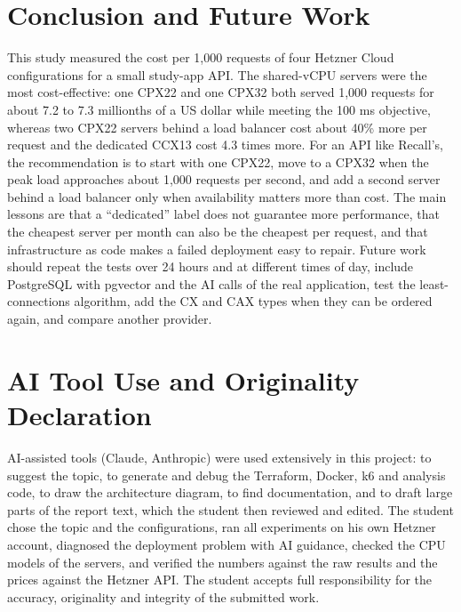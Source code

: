 \documentclass[conference,a4paper]{IEEEtran}
\begin{document}
\section{Conclusion and Future Work}
\label{sec:conclusion}

This study measured the cost per 1,000 requests of four Hetzner Cloud configurations for a small study-app API. The shared-vCPU servers were the most cost-effective: one CPX22 and one CPX32 both served 1,000 requests for about 7.2 to 7.3 millionths of a US dollar while meeting the 100 ms objective, whereas two CPX22 servers behind a load balancer cost about 40\% more per request and the dedicated CCX13 cost 4.3 times more. For an API like Recall's, the recommendation is to start with one CPX22, move to a CPX32 when the peak load approaches about 1,000 requests per second, and add a second server behind a load balancer only when availability matters more than cost. The main lessons are that a ``dedicated'' label does not guarantee more performance, that the cheapest server per month can also be the cheapest per request, and that infrastructure as code makes a failed deployment easy to repair. Future work should repeat the tests over 24 hours and at different times of day, include PostgreSQL with pgvector and the AI calls of the real application, test the least-connections algorithm, add the CX and CAX types when they can be ordered again, and compare another provider.

\section*{AI Tool Use and Originality Declaration}
\label{sec:ai_declaration}

AI-assisted tools (Claude, Anthropic) were used extensively in this project: to suggest the topic, to generate and debug the Terraform, Docker, k6 and analysis code, to draw the architecture diagram, to find documentation, and to draft large parts of the report text, which the student then reviewed and edited. The student chose the topic and the configurations, ran all experiments on his own Hetzner account, diagnosed the deployment problem with AI guidance, checked the CPU models of the servers, and verified the numbers against the raw results and the prices against the Hetzner API. The student accepts full responsibility for the accuracy, originality and integrity of the submitted work.
\end{document}
